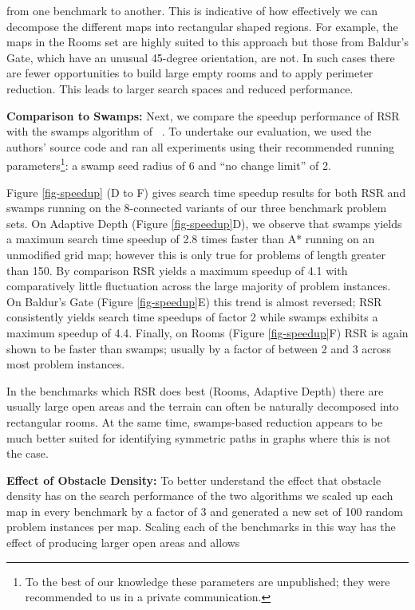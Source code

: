from one benchmark to another. This is indicative of how effectively we can 
decompose the different maps into rectangular shaped regions.
For example, the maps in the Rooms set are highly suited to this approach but those
from Baldur's Gate, which have an unusual 45-degree orientation, are not.
In such cases there are fewer opportunities to build large empty rooms and to apply perimeter reduction.
This leads to larger search spaces and reduced performance. 
\par
\textbf{Comparison to Swamps:}
Next, we compare the speedup performance of RSR with the swamps algorithm
of \citeauthor{pochter10}~.
To undertake our evaluation, we used the authors' source code and ran all experiments 
using their recommended running parameters\footnote{To the best of our knowledge 
these parameters are unpublished; they were recommended to us in a private
communication.}:
 a swamp seed radius of 6 and ``no change limit'' of 2.
\par
Figure \ref{fig-speedup} (D to F) gives search time speedup results for both 
RSR and swamps running on the 8-connected variants of our three benchmark 
problem sets. 
On Adaptive Depth (Figure \ref{fig-speedup}D), we observe that 
swamps yields a maximum search time speedup of 2.8 times faster than 
 A* running on an unmodified grid map; however this is only true for problems of length greater than 150.
By comparison RSR yields a maximum speedup of 4.1 with comparatively little fluctuation across the
large majority of problem instances.
On Baldur's Gate (Figure \ref{fig-speedup}E) this trend is almost reversed; RSR consistently 
yields search time speedups of factor 2 while swamps exhibits a maximum speedup of 4.4.
Finally, on Rooms (Figure \ref{fig-speedup}F) RSR is again shown to be faster than swamps;
usually by a factor of between 2 and 3 across most problem instances.
\par
In the benchmarks which RSR does best (Rooms, Adaptive Depth) 
there are usually large open areas and the terrain can often be naturally decomposed into rectangular rooms.
At the same time, swamps-based reduction appears to be much better suited for identifying symmetric paths 
in graphs where this is not the case.
\par
\textbf{Effect of Obstacle Density:}
To better understand the effect that obstacle density has on the search performance of the two algorithms
we scaled up each map in every benchmark by a factor of 3 and generated a new
set of 100 random problem instances per map.
Scaling each of the benchmarks in this way has the effect of producing larger open areas and allows 
